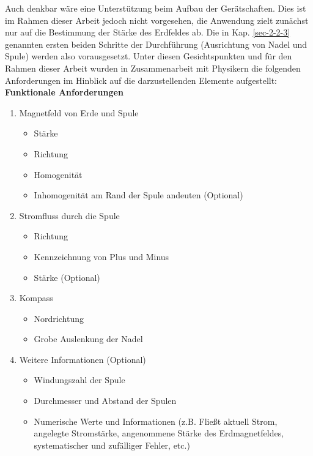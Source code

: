 Auch denkbar wäre eine Unterstützung beim Aufbau der Gerätschaften. Dies ist im Rahmen dieser Arbeit jedoch nicht vorgesehen, die Anwendung zielt zunächst nur auf die Bestimmung der Stärke des Erdfeldes ab. Die in Kap. \ref{sec-2-2-3} genannten ersten beiden Schritte der Durchführung (Ausrichtung von Nadel und Spule) werden also vorausgesetzt. Unter diesen Gesichtspunkten und für den Rahmen dieser Arbeit wurden in Zusammenarbeit mit Physikern die folgenden Anforderungen im Hinblick auf die darzustellenden Elemente aufgestellt:\\[4px]
\textbf{Funktionale Anforderungen}
\begin{enumerate}[topsep=-2px]
	\setlength{\itemsep}{-5pt}
	\item Magnetfeld von Erde und Spule
	\begin{itemize}[topsep=-0.25em]
		\setlength{\itemsep}{-0.25em}
		\item Stärke
		\item Richtung
		\item Homogenität
		\item Inhomogenität am Rand der Spule andeuten (Optional) 
	\end{itemize}
	\item Stromfluss durch die Spule
	\begin{itemize}[topsep=-0.25em]
		\setlength{\itemsep}{-0.25em}
		\item Richtung
		\item Kennzeichnung von Plus und Minus
		\item Stärke (Optional) 
	\end{itemize}
	\item Kompass
	\begin{itemize}[topsep=-0.25em]
		\setlength{\itemsep}{-0.25em}
		\item Nordrichtung
		\item Grobe Auslenkung der Nadel
	\end{itemize}
	\item Weitere Informationen (Optional)
	\begin{itemize}[topsep=-0.25em]
		\singlespacing
		\item Windungszahl der Spule
		\item Durchmesser und Abstand der Spulen
		\item Numerische Werte und Informationen (z.B. Fließt aktuell Strom, angelegte Stromstärke, angenommene Stärke des Erdmagnetfeldes, systematischer und zufälliger Fehler, etc.)
	\end{itemize}
\end{enumerate}
\vspace{6px}


